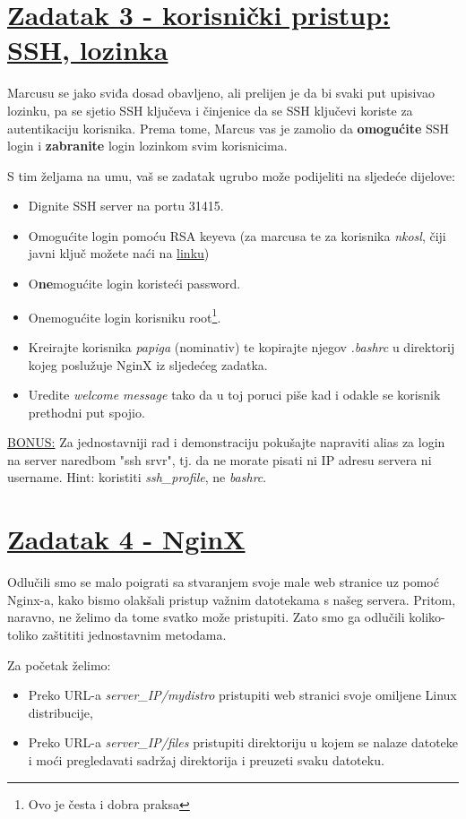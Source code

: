 \documentclass[12pt,a4paper]{article}
\begin{document}
	\newpage

	\section*{\underline{Zadatak 3 - korisnički pristup: SSH, lozinka}}
		Marcusu se jako sviđa dosad obavljeno, ali prelijen je da bi svaki put upisivao lozinku, pa se sjetio SSH ključeva i činjenice da se SSH ključevi koriste za autentikaciju korisnika. Prema tome, Marcus vas je zamolio da \textbf{omogućite} SSH login i \textbf{zabranite} login lozinkom svim korisnicima.
		\par S tim željama na umu, vaš se zadatak ugrubo može podijeliti na sljedeće dijelove:
		\begin{itemize}
			\item Dignite SSH server na portu 31415.
			\item Omogućite login pomoću RSA keyeva (za marcusa te za korisnika \textit{nkosl}, čiji javni ključ možete naći na \href{http://www.fer.unizg.hr/_download/repository/nkosl_rsa.pub}{linku}) 
			\item O\textbf{ne}mogućite login koristeći password. 
			\item Onemogućite login korisniku root\footnote{Ovo je česta i dobra praksa}.
			\item Kreirajte korisnika \textit{papiga} (nominativ) te kopirajte njegov \textit{.bashrc} u direktorij kojeg poslužuje NginX iz sljedećeg zadatka.
			\item Uredite \textit{welcome message} tako da u toj poruci piše kad i odakle se korisnik prethodni put spojio.  
		\end{itemize}
		\underline{BONUS:} Za jednostavniji rad i demonstraciju pokušajte napraviti alias za login na server naredbom "ssh srvr", tj. da ne morate pisati ni IP adresu servera ni username.
		Hint: koristiti \textit{ssh\_profile}, ne \textit{bashrc}.


		\newpage

		\section*{\underline{Zadatak 4 - NginX}}
		Odlučili smo se malo poigrati sa stvaranjem svoje male web stranice uz pomoć Nginx-a, kako bismo olakšali pristup važnim datotekama s našeg servera. Pritom, naravno, ne želimo da tome svatko može pristupiti. Zato smo ga odlučili koliko-toliko zaštititi jednostavnim metodama.

		\par Za početak želimo:
		\begin{itemize}
			\item Preko URL-a \textit{server\_IP/mydistro} pristupiti web stranici svoje omiljene Linux distribucije,
			\item Preko URL-a \textit{server\_IP/files} pristupiti direktoriju u kojem se nalaze datoteke i moći pregledavati sadržaj direktorija i preuzeti svaku datoteku.
		\end{itemize}
\end{document}
